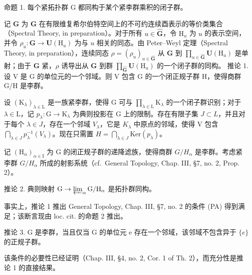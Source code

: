 
命题 1. 每个紧拓扑群 G 都同构于某个紧李群乘积的闭子群。

记 \(\hat{\mathbf{G}}\) 为 \(\mathbf{G}\) 在有限维复希尔伯特空间上的不可约连续酉表示的等价类集合（Spectral Theory, in preparation）。对于所有 \(u\in \hat{\mathbf{G}}\)，令 \(\mathrm{H}_u\) 为 \(u\) 的表示空间，并令 \(\rho_{u}:\mathbf{G}\to \mathbf{U}(\mathrm{H}_{u})\) 为与 \(u\) 相关的同态。由 Peter–Weyl 定理（Spectral Theory, in preparation），连续同态 \(\rho = (\rho_u)_{u\in \hat{\mathbf{G}}}\) 从 \(\mathbf{G}\) 到 \(\prod_{u\in \hat{\mathbf{G}}}\mathbf{U}(\mathrm{H}_u)\) 是单射；由于 \(\mathbf{G}\) 紧，\(\rho\) 诱导出从 \(\mathbf{G}\) 到群 \(\prod_{\hat{\mathbf{G}}} \mathbf{U}(\mathrm{H}_u)\) 的一个闭子群的同构。
推论 1. 设 V 是 G 的单位元的一个邻域。则 V 包含 G 的一个闭正规子群 H，使得商群 G/H 是李群。

设 \((\mathrm{K}_{\lambda})_{\lambda \in \mathrm{L}}\) 是一族紧李群，使得 \(\mathrm{G}\) 可与 \(\prod_{\lambda \in \mathrm{L}}\mathrm{K}_{\lambda}\) 的一个闭子群识别；对于 \(\lambda \in \mathrm{L}\)，记 \(p_{\lambda}:\mathrm{G}\to \mathrm{K}_{\lambda}\) 为典则投影在 G 上的限制。存在有限子集 \(J \subset L\)，并且对于每个 \(\lambda \in J\)，存在一个邻域 \(V_{\lambda}\)，它是 \(K_{\lambda}\) 中原点的邻域，使得 V 包含 \(\bigcap_{\lambda \in J} p_{\lambda}^{-1}(V_{\lambda})\)。现在只需置 \(H = \bigcap_{\lambda \in J} \text{Ker}(p_{\lambda})\)。

记 \((\mathrm{H}_{\alpha})_{\alpha\in\mathrm{I}}\) 为 G 的闭正规子群的递降滤族，使得商群 \(G/H_{\alpha}\) 是李群。考虑紧李群 \(G/H_{\alpha}\) 所成的射影系统（cf.~General Topology, Chap. III, §7, no. 2, Prop. 2）。

推论 2. 典则映射 \(\mathrm{G} \to \varprojlim_{\alpha} \mathrm{G} / \mathrm{H}_{\alpha}\) 是拓扑群同构。

事实上，推论 1 推出 General Topology, Chap. III, §7, no. 2 的条件 (PA) 得到满足；该断言现由 loc. cit. 的命题 2 推出。

推论 3. G 是李群，当且仅当 G 的单位元 e 存在一个邻域，该邻域不包含异于 \(\{e\}\) 的正规子群。

该条件的必要性已经证明（Chap. III, §4, no. 2, Cor. 1 of Th. 2），而充分性是推论 1 的直接结果。

